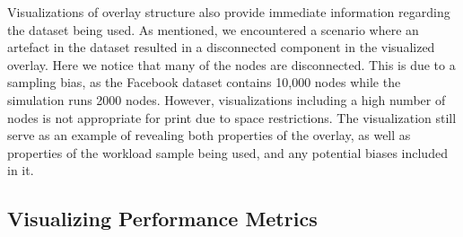 Visualizations of overlay structure also provide immediate information
regarding the dataset being used. As mentioned, we encountered a
scenario where an artefact in the dataset resulted in a disconnected
component in the visualized overlay. Here we notice that many of the
nodes are disconnected. This is due to a sampling bias, as the Facebook
dataset contains 10,000 nodes while the simulation runs 2000 nodes.
However, visualizations including a high number of nodes is not
appropriate for print due to space restrictions.  The visualization still serve as an
example of revealing both properties of the overlay, as well as
properties of the workload sample being used, and any potential biases
included in it.

\subsection{Visualizing Performance Metrics}
\label{sec:viz_perf}

